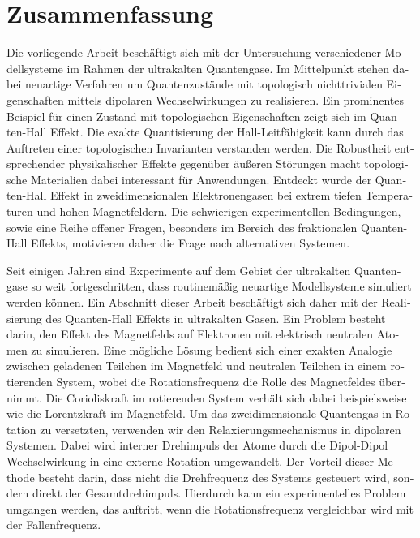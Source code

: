 \chapter*{Zusammenfassung}

\begin{otherlanguage}{ngerman}

Die vorliegende Arbeit beschäftigt sich mit der Untersuchung verschiedener
Modellsysteme im Rahmen der ultrakalten Quantengase.
Im Mittelpunkt stehen dabei neuartige Verfahren um Quantenzustände mit topologisch nichttrivialen Eigenschaften mittels dipolaren Wechselwirkungen zu realisieren.
Ein prominentes Beispiel für einen Zustand mit topologischen Eigenschaften zeigt sich im Quanten-Hall Effekt.
Die exakte Quantisierung der Hall-Leitfähigkeit kann durch das Auftreten einer topologischen Invarianten verstanden werden.
Die Robustheit entsprechender physikalischer Effekte gegenüber äußeren Störungen macht topologische Materialien dabei interessant für Anwendungen.
Entdeckt wurde der Quanten-Hall Effekt in zweidimensionalen Elektronengasen bei extrem tiefen Temperaturen und hohen Magnetfeldern.
Die schwierigen experimentellen Bedingungen, sowie eine Reihe offener Fragen, besonders im Bereich des fraktionalen Quanten-Hall Effekts, motivieren daher die Frage nach alternativen Systemen.

Seit einigen Jahren sind Experimente auf dem Gebiet der ultrakalten Quantengase so weit fortgeschritten, dass routinemäßig neuartige Modellsysteme simuliert werden können.
Ein Abschnitt dieser Arbeit beschäftigt sich daher mit der Realisierung des Quanten-Hall Effekts in ultrakalten Gasen.
Ein Problem besteht darin, den Effekt des Magnetfelds auf Elektronen mit elektrisch neutralen Atomen zu simulieren.
Eine mögliche Lösung bedient sich einer exakten Analogie zwischen geladenen Teilchen im Magnetfeld und neutralen Teilchen in einem rotierenden System, wobei die Rotationsfrequenz die Rolle des Magnetfeldes übernimmt.
Die Corioliskraft im rotierenden System verhält sich dabei beispielsweise wie die Lorentzkraft im Magnetfeld.
Um das zweidimensionale Quantengas in Rotation zu versetzten, verwenden wir den Relaxierungsmechanismus in dipolaren Systemen.
Dabei wird interner Drehimpuls der Atome durch die Dipol-Dipol Wechselwirkung in eine externe Rotation umgewandelt.
Der Vorteil dieser Methode besteht darin, dass nicht die Drehfrequenz des Systems gesteuert wird, sondern direkt der Gesamtdrehimpuls.
Hierdurch kann ein experimentelles Problem umgangen werden, das auftritt, wenn die Rotationsfrequenz vergleichbar wird mit der Fallenfrequenz.


\end{otherlanguage}
